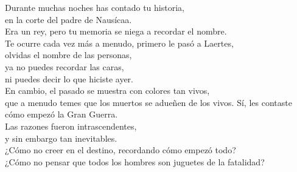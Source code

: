 \label{cap:guerra}

\begin{versopropio}
Durante muchas noches has contado tu historia,\\
en la corte del padre de Nausícaa.\\
Era un rey, pero tu memoria se niega a recordar el nombre.\\
Te ocurre cada vez más a menudo, primero le pasó a Laertes,\\
olvidas el nombre de las personas,\\
ya no puedes recordar las caras,\\
ni puedes decir lo que hiciste ayer.\\
En cambio, el pasado se muestra con colores tan vivos,\\
que a menudo temes que los muertos se adueñen de los vivos.
\stanzabreak
Sí, les contaste cómo empezó la Gran Guerra.\\
Las razones fueron intrascendentes,\\
y sin embargo tan inevitables.\\
¿Cómo no creer en el destino, recordando cómo empezó todo?\\
¿Cómo no pensar que todos los hombres son juguetes de la fatalidad?
\end{versopropio}

